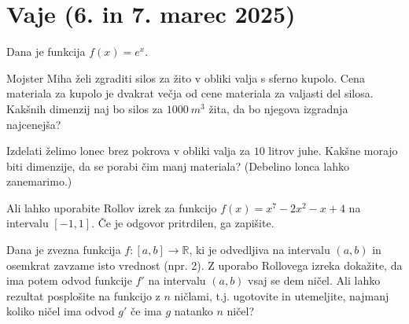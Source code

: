 \documentclass[11pt,a4paper]{exam}
\renewcommand{\geq}{\geqslant}
\renewcommand{\{}{\lbrace}
\renewcommand{\}}{\rbrace}
\begin{document}
\section*{Vaje (6. in 7. marec 2025)}
\begin{questions}

	\question Dana je funkcija $f(x) = e^{x}$.

	 \question Mojster Miha želi zgraditi silos za žito v obliki valja s sferno kupolo. Cena materiala za kupolo je dvakrat večja od cene materiala za valjasti del silosa. Kakšnih dimenzij naj bo silos za $1000 \ { m}^3$ žita, da bo njegova izgradnja najcenejša?


			\question Izdelati želimo lonec brez pokrova v obliki valja za $10$ litrov juhe. Kakšne morajo biti dimenzije, da se porabi čim manj materiala? (Debelino lonca lahko zanemarimo.)

			\question Ali lahko uporabite Rollov izrek za funkcijo $f(x) = x^{7}-2x^2-x+4$ na intervalu $[-1,1]$. Če je odgovor pritrdilen, ga zapišite.

			\question Dana je zvezna funkcija $f: [a,b] \to \mathbb{R}$, ki je odvedljiva na intervalu $(a,b)$ in osemkrat zavzame isto vrednost (npr. 2). Z uporabo Rollovega izreka dokažite, da ima potem odvod funkcije $f'$ na intervalu $(a,b)$ vsaj se dem ničel. Ali lahko rezultat posplošite na funkcijo z $n$ ničlami, t.j. ugotovite in utemeljite, najmanj koliko ničel ima odvod $g'$ če ima $g$ natanko $n$ ničel?

			\question 
			

\end{questions}
\end{document}
